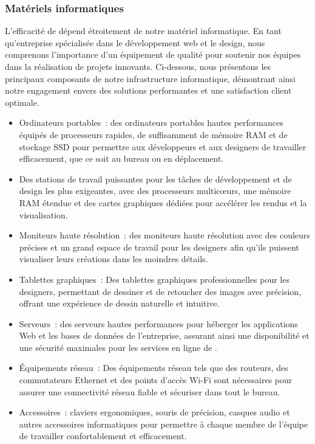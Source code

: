 \subsubsection { Matériels informatiques }
L’efficacité de \firm dépend étroitement de notre matériel informatique.
En tant qu’entreprise spécialisée dans le développement web et le design, nous
comprenons l’importance d’un équipement de qualité pour soutenir nos équipes dans
la réalisation de projets innovants. Ci-dessous, nous présentons les principaux
composants de notre infrastructure informatique, démontrant ainsi notre engagement
envers des solutions performantes et une satisfaction client optimale.
\begin{itemize}
  \item Ordinateurs portables : des ordinateurs portables hautes performances
    équipés de processeurs rapides, de suffisamment de mémoire RAM et de stockage SSD
    pour permettre aux développeurs et aux designers de travailler efficacement, que ce soit au bureau ou en déplacement.
  \item Des stations de travail puissantes pour les tâches de développement et de design
    les plus exigeantes, avec des processeurs multicœurs, une mémoire RAM étendue
    et des cartes graphiques dédiées pour accélérer les rendus et la visualisation.
  \item Moniteurs haute résolution : des moniteurs haute résolution avec des couleurs
    précises et un grand espace de travail pour les designers afin qu’ils puissent visualiser leurs créations dans les moindres détails.
  \item Tablettes graphiques : Des tablettes graphiques professionnelles pour les
    designers, permettant de dessiner et de retoucher des images avec précision,
    offrant une expérience de dessin naturelle et intuitive.
  \item Serveurs : des serveurs hautes performances pour héberger les applications
    Web et les bases de données de l’entreprise, assurant ainsi une disponibilité
    et une sécurité maximales pour les services en ligne de \firm.
  \item Équipements réseau : Des équipements réseau tels que des routeurs, des
    commutateurs Ethernet et des points d’accès Wi-Fi sont nécessaires pour
    assurer une connectivité réseau fiable et sécuriser dans tout le bureau.
  \item Accessoires : claviers ergonomiques, souris de précision, casques audio et
    autres accessoires informatiques pour permettre à chaque membre de l’équipe
    de travailler confortablement et efficacement.

\end{itemize}


